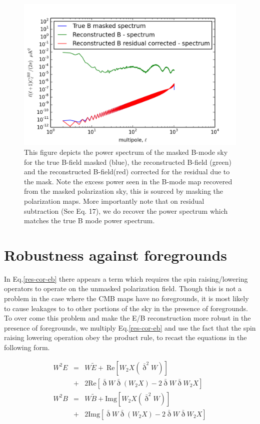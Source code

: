 \documentclass[prd,amsmath,amssymb,floatfix,nofootinbib,preprintnumbers,twocolumn]{revtex4}%
\newcommand{\beqry}{\begin{eqnarray}}
\newcommand{\eeqry}{\end{eqnarray}}
\begin{document}
\begin{figure}[!h]
\includegraphics[scale=0.6]{clbb-compare.png}
\caption{This figure depicts the power spectrum of the masked B-mode sky for the true B-field masked (blue), the reconstructed B-field (green) and the reconstructed B-field(red) corrected for the residual due to the mask. Note the excess power seen in the B-mode map recovered from the masked polarization sky, this is sourced by masking the polarization maps. More importantly note that on residual subtraction (See Eq. 17), we do recover the power spectrum which matches the true B mode power spectrum.}
\end{figure}

\section{Robustness against foregrounds}

In Eq.\ref{res-cor-eb} there appears a term which requires the spin raising/lowering operators to operate on the unmasked polarization field. Though this is not a problem in the case where the CMB maps have no foregrounds, it is most likely to cause leakages to to other portions of the sky in the presence of foregrounds. To over come this problem and make the E/B reconstruction more robust in the presence of foregrounds, we multiply Eq.\ref{res-cor-eb} and use the fact that the spin raising lowering operation obey the product rule, to recast the equations in the following form.

%
\beqry
W^2E &=& W\tilde{E}  +  ~\mathrm{Re}[W_{2} X (\bar{\eth}^2 W)] \nonumber \\ &+&  2\mathrm{Re}[\bar{\eth} W  \bar{\eth} (W_{ 2} X) - 2\bar{\eth} W  \bar{\eth}W _{ 2} X] \\
W^2B &=& W\tilde{B}  + \mathrm{Img}[W_{ 2} X (\bar{\eth}^2 W)] \nonumber \\ &+&  2 \mathrm{Img}[\bar{\eth}W\bar{\eth}(W_{ 2} X) - 2\bar{\eth} W  \bar{\eth}W _{ 2} X] 
\eeqry
%
\end{document}
